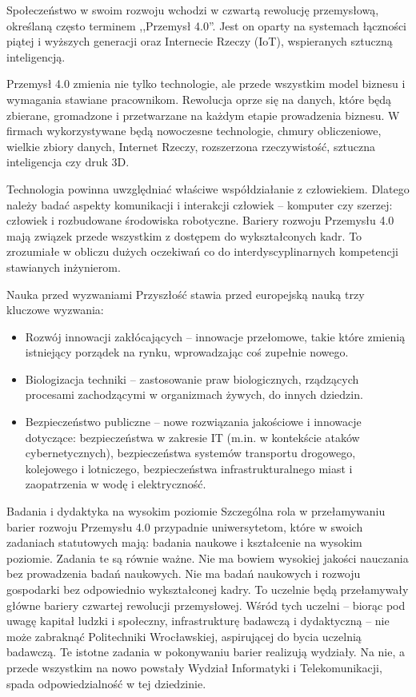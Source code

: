 Społeczeństwo w swoim rozwoju wchodzi w czwartą rewolucję przemysłową, określaną często terminem ,,Przemysł 4.0''. Jest on oparty na systemach łączności piątej i wyższych generacji oraz Internecie Rzeczy (IoT), wspieranych sztuczną inteligencją.

Przemysł 4.0 zmienia nie tylko technologie, ale przede wszystkim model biznesu i wymagania stawiane pracownikom. Rewolucja oprze się na danych, które będą zbierane, gromadzone i przetwarzane na każdym etapie prowadzenia biznesu. W firmach wykorzystywane będą nowoczesne technologie, chmury obliczeniowe, wielkie zbiory danych, Internet Rzeczy, rozszerzona rzeczywistość, sztuczna inteligencja czy druk 3D.

Technologia powinna uwzględniać właściwe współdziałanie z człowiekiem. Dlatego należy badać aspekty komunikacji i interakcji człowiek – komputer czy szerzej: człowiek i rozbudowane środowiska robotyczne. Bariery rozwoju Przemysłu 4.0 mają związek przede wszystkim z dostępem do wykształconych kadr. To zrozumiałe w obliczu dużych oczekiwań co do interdyscyplinarnych kompetencji stawianych inżynierom.

Nauka przed wyzwaniami
Przyszłość stawia przed europejską nauką trzy kluczowe wyzwania:

\begin{itemize}
    \item Rozwój innowacji zakłócających – innowacje przełomowe, takie które zmienią istniejący porządek na rynku, wprowadzając coś zupełnie nowego.
    \item Biologizacja techniki – zastosowanie praw biologicznych, rządzących procesami zachodzącymi w organizmach żywych, do innych dziedzin.
    \item Bezpieczeństwo publiczne – nowe rozwiązania jakościowe i innowacje dotyczące: bezpieczeństwa w zakresie IT (m.in. w kontekście ataków cybernetycznych), bezpieczeństwa systemów transportu drogowego, kolejowego i lotniczego, bezpieczeństwa infrastrukturalnego miast i zaopatrzenia w wodę i elektryczność.
\end{itemize}

Badania i dydaktyka na wysokim poziomie
Szczególna rola w przełamywaniu barier rozwoju Przemysłu 4.0 przypadnie uniwersytetom, które w swoich zadaniach statutowych mają: badania naukowe i kształcenie na wysokim poziomie.
Zadania te są równie ważne. Nie ma bowiem wysokiej jakości nauczania bez prowadzenia badań naukowych. Nie ma badań naukowych i rozwoju gospodarki bez odpowiednio wykształconej kadry. To uczelnie będą przełamywały główne bariery czwartej rewolucji przemysłowej. Wśród tych uczelni – biorąc pod uwagę kapitał ludzki i społeczny, infrastrukturę badawczą i dydaktyczną – nie może zabraknąć Politechniki Wrocławskiej, aspirującej do bycia uczelnią badawczą. Te istotne zadania w pokonywaniu barier realizują wydziały. Na nie, a przede wszystkim na nowo powstały Wydział Informatyki i Telekomunikacji, spada odpowiedzialność w tej dziedzinie.

